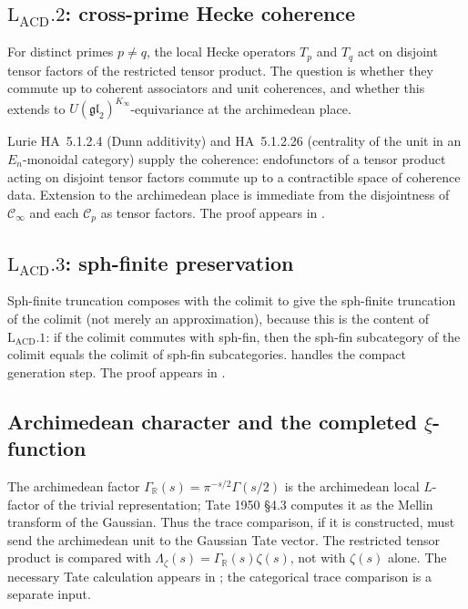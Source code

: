 \subsection{\(\mathrm{L}_{\mathrm{ACD}}.2\): cross-prime Hecke coherence}

For distinct primes \(p \neq q\), the local Hecke operators \(T_{p}\)
and \(T_{q}\) act on disjoint tensor factors of the restricted tensor
product. The question is whether they commute up to coherent associators
and unit coherences, and whether this extends to
\(U(\mathfrak{gl}_{2})^{K_{\infty}}\)-equivariance at the archimedean place.

Lurie HA~5.1.2.4 (Dunn additivity) and HA~5.1.2.26 (centrality of the
unit in an \(E_{n}\)-monoidal category) supply the coherence: endofunctors
of a tensor product acting on disjoint tensor factors commute up to a
contractible space of coherence data. Extension to the archimedean place
is immediate from the disjointness of \(\mathcal{C}_{\infty}\) and each
\(\mathcal{C}_{p}\) as tensor factors. The proof appears in
.

\subsection{\(\mathrm{L}_{\mathrm{ACD}}.3\): sph-finite preservation}

Sph-finite truncation composes with the colimit to give the sph-finite
truncation of the colimit (not merely an approximation), because this is
the content of \(\mathrm{L}_{\mathrm{ACD}}.1\): if the colimit commutes with
sph-fin, then the sph-fin subcategory of the colimit equals the colimit of
sph-fin subcategories. 
handles the compact generation step. The proof appears in
.

\subsection{Archimedean character and the completed \(\xi\)-function}

The archimedean factor \(\Gamma_{\mathbb{R}}(s) = \pi^{-s/2}\Gamma(s/2)\)
is the archimedean local \(L\)-factor of the trivial representation;
Tate 1950 \S4.3 computes it as the Mellin transform of the Gaussian.
Thus the trace comparison, if it is constructed, must send the
archimedean unit to the Gaussian Tate vector. The restricted tensor
product is compared with
\(\Lambda_{\zeta}(s)=\Gamma_{\mathbb R}(s)\zeta(s)\), not with
\(\zeta(s)\) alone. The necessary Tate calculation appears in
; the categorical trace comparison is a
separate input.

